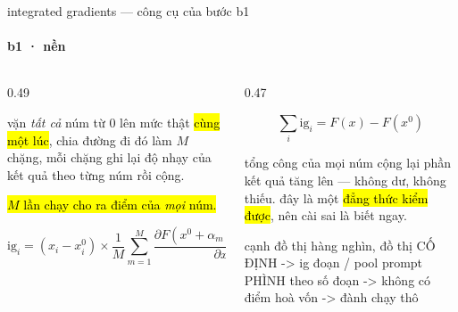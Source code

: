
\begin{frame}[fragile]{integrated gradients — công cụ của bước b1}
  \framesubtitle{b1 · nền}

  \begin{columns}[t]
  \begin{column}{0.49\textwidth}
    \begin{keyb}[title={ig làm khác}]
      vặn \emph{tất cả} núm từ 0 lên mức thật \hl{cùng một lúc}, chia đường đi đó
      làm $M$ chặng, mỗi chặng ghi lại độ nhạy của kết quả theo từng núm rồi cộng.
      \vspace{0.25em}

      \hl{$M$ lần chạy cho ra điểm của \emph{mọi} núm.}
    \end{keyb}
    \[
      \mathrm{ig}_i = (x_i - x_i^{0}) \times
      \frac{1}{M}\sum_{m=1}^{M}
      \frac{\partial F\!\left(x^{0} + \alpha_m (x - x^{0})\right)}{\partial x_i}
    \]
  \end{column}
  \begin{column}{0.47\textwidth}
    \begin{bx}[title={tính chất đáng tiền: completeness}]
      \[ \textstyle\sum_i \mathrm{ig}_i = F(x) - F(x^0) \]
      \vspace{-0.5em}

      tổng công của mọi núm cộng lại  phần kết quả tăng lên —
      không dư, không thiếu. đây là một \hl{đẳng thức kiểm được}, nên cài sai
      là biết ngay.
    \end{bx}
    \begin{bx}[title={vì sao tầng a dùng cách thô, tầng b dùng ig}]
      \begin{dia}
cạnh đồ thị  hàng nghìn, đồ thị CỐ ĐỊNH -> ig
đoạn / pool  prompt PHÌNH theo số đoạn
             -> không có điểm hoà vốn
             -> đành chạy thô
      \end{dia}
    \end{bx}
  \end{column}
  \end{columns}
\end{frame}

